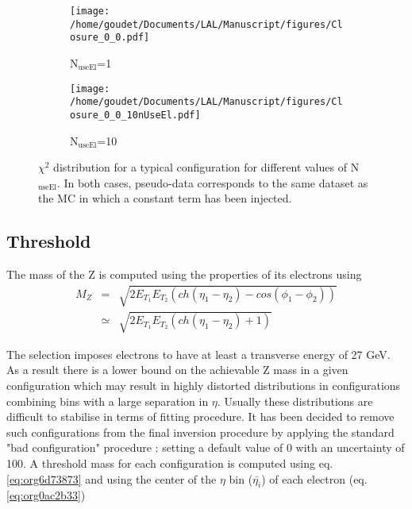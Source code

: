 \begin{figure}
\begin{subfigure}[t]{0.49\linewidth}
\begin{center}
\texttt{[image: /home/goudet/Documents/LAL/Manuscript/figures/Closure\_0\_0.pdf]}
\end{center}
\caption{N\(_{\text{useEl}}\)=1}
\end{subfigure}
\begin{subfigure}[t]{0.49\linewidth}
\begin{center}
\texttt{[image: /home/goudet/Documents/LAL/Manuscript/figures/Closure\_0\_0\_10nUseEl.pdf]}
\end{center}
\caption{N\(_{\text{useEl}}\)=10}
\end{subfigure}
\caption{\label{org98e07ca}
$\chi^2$ distribution for a typical configuration for different values of N\(_{\text{useEl}}\). In both cases, pseudo-data corresponds to the same dataset as the MC in which a constant term has been injected.}
\end{figure}


\subsection{Threshold}
\label{sec:org899f075}

The mass of the Z is computed using the properties of its electrons using
\begin{equation}
  \label{eq:org6d73873}
  \begin{array}{lcl}
    M_Z &=& \sqrt{2E_{T_1}E_{T_2}(ch(\eta_1-\eta_2) - cos(\phi_1-\phi_2) )} \\
            &\simeq &\sqrt{2E_{T_1}E_{T_2}(ch(\eta_1-\eta_2) +1 )}
    \end{array}
\end{equation}

The selection imposes electrons to have at least a transverse energy of 27 GeV.
As a result there is a lower bound on the achievable Z mass in a given configuration which may result in highly distorted distributions in configurations combining bins with a large separation in $\eta$.
Usually these distributions are difficult to stabilise in terms of fitting procedure.
It has been decided to remove such configurations from the final inversion procedure by applying the standard "bad configuration" procedure : setting a default value of 0 with an uncertainty of 100.
A threshold mass for each configuration is computed using eq. \ref{eq:org6d73873} and using the center of the $\eta$ bin (\(\bar{\eta_i}\)) of each electron (eq. \ref{eq:org0ac2b33})


